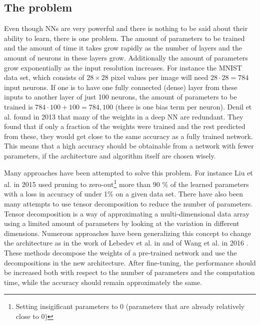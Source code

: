 \subsection{The problem}
Even though NNs are very powerful and there is nothing to be said about their ability to learn, there is one problem. The amount of parameters to be trained and the amount of time it takes grow rapidly as the number of layers and the amount of neurons in these layers grow. Additionally the amount of parameters grow exponentially as the input resolution increases. For instance the MNIST data set, which consists of $28\times28$ pixel values per image will need $28\cdot28 = 784$ input neurons. If one is to have one fully connected (dense) layer from these inputs to another layer of just 100 neurons, the amount of parameters to be trained is $784 \cdot 100 + 100 = 784,100$ (there is one bias term per neuron). Denil et al. found in 2013 that many of the weights in a deep NN are redundant\cite{Denil2013}. They found that if only a fraction of the weights were trained and the rest predicted from these, they would get close to the same accuracy as a fully trained network. This means that a high accuracy should be obtainable from a network with fewer parameters, if the architecture and algorithm itself are chosen wisely.

Many approaches have been attempted to solve this problem. For instance Liu et al. in 2015 used pruning to zero-out\footnote{Setting insigificant parameters to 0 (parameters that are already relatively close to 0)} more than 90 \% of the learned parameters with a loss in accuracy of under 1\% on a given data set. There have also been many attempts to use tensor decomposition to reduce the number of parameters. Tensor decomposition is a way of approximating a multi-dimensional data array using a limited amount of parameters by looking at the variation in different dimensions. Numerous approaches have been generalizing this concept to change the architecture as in the work of Lebedev et al. in \cite{Lebedev2015} and of Wang et al. in 2016 \cite{Wang2016}. These methods decompose the weights of a pre-trained network and use the decompositions in the new architecture. After fine-tuning, the performance should be increased both with respect to the number of parameters and the computation time, while the accuracy should remain approximately the same.


